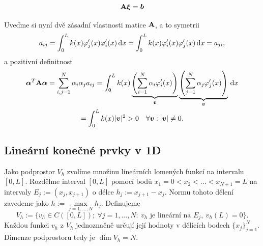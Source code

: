 \begin{equation}
  \mathbf{A} \mathbf{\boldsymbol{\xi}} = \mathbf{\boldsymbol{b}}\label{eqn:linear_system}
\end{equation}

Uveďme si nyní dvě zásadní vlastnosti matice $\mathbf{A}$, a to symetrii
\begin{equation}
  a_{ij} = \int_0^L k(x) \varphi'_j(x) \varphi_i'(x) \,{\rm d} x = \int_0^L k(x) \varphi'_i(x) \varphi_j'(x) \,{\rm d} x = a_{ji}, \label{eqn:linear_system_symetry}
\end{equation}
a pozitivní definitnost
\begin{multline}
  \mathbf{\boldsymbol{\alpha}}^T \mathbf{A} \mathbf{\boldsymbol{\alpha}} = \sum\limits_{i,j=1}^N \alpha_i \alpha_j a_{ij}
  = \int_0^L k(x)
    \underbrace{\left( \sum\limits_{i=1}^N \alpha_i \varphi'_i(x) \right)}_{\mathbf{\boldsymbol{v}}}
    \underbrace{\left( \sum\limits_{j=1}^N \alpha_j \varphi'_j(x) \right)}_{\mathbf{\boldsymbol{v}}} \,{\rm d} x \\
  = \int_0^L k(x) |\mathbf{\boldsymbol{v}}|^2 > 0 \quad \forall \mathbf{\boldsymbol{v}}: |\mathbf{\boldsymbol{v}}|\neq 0. \label{eqn:linear_system_pos_def}
\end{multline}
    
    
    
\subsection{Lineární konečné prvky v 1D}
Jako podprostor $V_h$ zvolíme množinu lineárních lomených funkcí na intervalu $[0,L]$.
Rozdělme interval $[0,L]$ pomocí bodů $x_1=0<x_2<...<x_{N+1}=L$ na intervaly $E_j:=(x_j,x_{j+1})$ o délce $h_j:=x_{j+1}-x_{j}$.
Normu tohoto dělení zavedeme jako $h:=\max\limits_{j=1,...,N} h_j$.
Definujeme
\[ V_h:=\{v_h\in C([0,L]);~\forall j=1,...,N:~v_h \mbox{ je lineární na }E_j,~v_h(L)=0 \}. \]
Každou funkci $v_h$ z $V_h$ jednoznačně určují její hodnoty v dělících bodech $\{x_j\}_{j=1}^N$.
Dimenze podprostoru tedy je $\dim V_h=N$.

